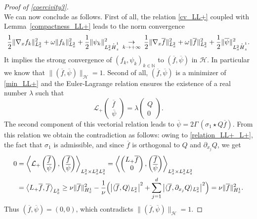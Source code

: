 \documentclass[11pt]{article}
\let\oldbar\bar\let\oldhat\hat\let\oldtilde\tilde
\let\bar\oldbar
\let\hat\oldhat
\let\tilde\oldtilde
\DeclareRobustCommand{\accentset}[2]{\overset{#1}{#2}}
\theoremstyle{definition}
\newcommand*{\overbigdot}[1]{%
\accentset{\mbox{\large\bfseries .}}{#1}}
\let\bar\overline
\let\hat\widehat
\let\tilde\widetilde
\newenvironment{ProofOf}[1]{\begin{proof}[Proof of #1]}{\end{proof}}
\begin{document}
\begin{ProofOf}{\eqref{coercivity3}}
\begin{equation}
\end{equation}
We can now conclude as follows. First of all, the relation \eqref{cv_LL+} coupled with Lemma~\ref{compactness_LL+} leads to the norm convergence
\[
\frac{1}{2}\|\nabla_{x}f_{k}\|_{L_{x}^{2}}^{2}+\omega\|f_{k}\|_{L_{x}^{2}}^{2}+\frac{1}{2}\|\psi_{k}\|_{L_{x}^{2}\overbigdot{H}_{z}^{1}}^{2}\,\underset{k\to +\infty}{\to}\,\frac{1}{2}\|\nabla_{x}\bar{f}\|_{L_{x}^{2}}^{2}+\omega\|\bar{f}\|_{L_{x}^{2}}^{2}+\frac{1}{2}\|\bar{\psi}\|_{L_{x}^{2}\overbigdot{H}_{z}^{1}}^{2}.
\]
It implies the strong convergence of $(f_{k},\psi_{k})_{k\in\mathbb N}$ to $(\bar{f},\bar{\psi})$ in $\mathscr{H}$. In particular we know that $\|(\bar{f},\bar{\psi})\|_{\mathscr{H}}=1$. Second of all, $(\bar{f},\bar{\psi})$ is a minimizer of \eqref{min_LL+} and the Euler-Lagrange relation ensures the existence of a real number $\lambda$ such that
\[
\mathcal{L}_{+}\begin{pmatrix} \bar{f}\\\bar{\psi} \end{pmatrix}=\lambda\begin{pmatrix} Q\\0 \end{pmatrix}.
\]
The second component of this vectorial relation leads to $\bar{\psi}=2\Gamma\,(\sigma_{1}\star Q\bar{f})$. From this relation we obtain the contradiction as follows: owing to \eqref{relation_LL+_L+}, the fact that $\sigma_1$ is admissible, and since $\bar{f}$ is orthogonal to $Q$ and $\partial_{x_{j}}Q$, we get
\begin{align*}
0&=\left\langle\mathcal{L}_{+}\begin{pmatrix} \bar{f}\\\bar{\psi} \end{pmatrix},\begin{pmatrix} \bar{f}\\\bar{\psi} \end{pmatrix}\right\rangle_{L_{x}^{2}\times L_{x}^{2}L_{z}^{2}}=\left\langle\begin{pmatrix} L_{+}\bar{f}\\0 \end{pmatrix},\begin{pmatrix} \bar{f}\\\bar{\psi} \end{pmatrix}\right\rangle_{L_{x}^{2}\times L_{x}^{2}L_{z}^{2}}\\
&=\left\langle L_{+}\bar{f},\bar{f}\right\rangle_{L_{x}^{2}}\geq\nu\|\bar{f}\|_{H_{x}^{1}}^{2}-\frac{1}{\nu}\Bigl(\left|\langle \bar{f},Q\rangle_{L_{x}^{2}}\right|^{2}+\sum\limits_{j=1}^{d}\left|\langle \bar{f},\partial_{x_{j}}Q\rangle_{L_{x}^{2}}\right|^{2}\Bigr)=\nu\|\bar{f}\|_{H_{x}^{1}}^{2}.
\end{align*}
Thus $(\bar{f},\bar{\psi})=(0,0)$, which contradicts $\|(\bar{f},\bar{\psi})\|_{\mathscr{H}}=1$.
\end{ProofOf}
\end{document}
